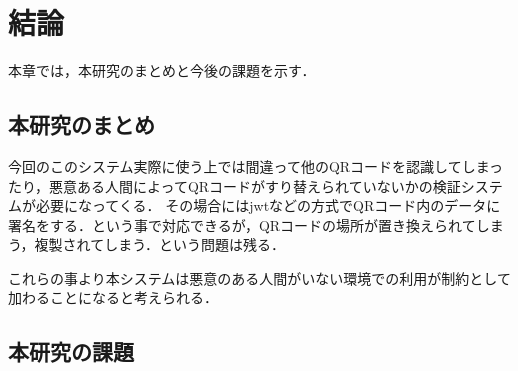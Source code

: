 \chapter{結論}
\label{conclusion}

本章では，本研究のまとめと今後の課題を示す．

\section{本研究のまとめ}
今回のこのシステム実際に使う上では間違って他のQRコードを認識してしまったり，悪意ある人間によってQRコードがすり替えられていないかの検証システムが必要になってくる．
その場合にはjwtなどの方式でQRコード内のデータに署名をする．という事で対応できるが，QRコードの場所が置き換えられてしまう，複製されてしまう．という問題は残る．

これらの事より本システムは悪意のある人間がいない環境での利用が制約として加わることになると考えられる．

\section{本研究の課題}

